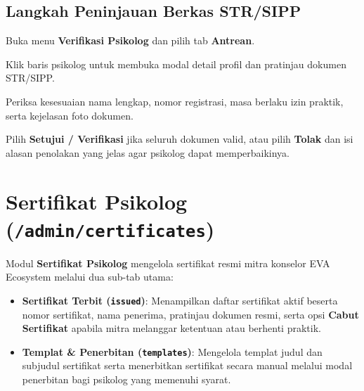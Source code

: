 \subsection{Langkah Peninjauan Berkas STR/SIPP}
\begin{steplist}
  \item Buka menu \textbf{Verifikasi Psikolog} dan pilih tab \textbf{Antrean}.
  \item Klik baris psikolog untuk membuka modal detail profil dan pratinjau dokumen STR/SIPP.
  \item Periksa kesesuaian nama lengkap, nomor registrasi, masa berlaku izin praktik, serta kejelasan foto dokumen.
  \item Pilih \textbf{Setujui / Verifikasi} jika seluruh dokumen valid, atau pilih \textbf{Tolak} dan isi alasan penolakan yang jelas agar psikolog dapat memperbaikinya.
\end{steplist}



\section{Sertifikat Psikolog (\texttt{/admin/certificates})}
Modul \textbf{Sertifikat Psikolog} mengelola sertifikat resmi mitra konselor EVA Ecosystem melalui dua sub-tab utama:
\begin{itemize}[leftmargin=1.4em]
  \item \textbf{Sertifikat Terbit (\texttt{issued})}: Menampilkan daftar sertifikat aktif beserta nomor sertifikat, nama penerima, pratinjau dokumen resmi, serta opsi \textbf{Cabut Sertifikat} apabila mitra melanggar ketentuan atau berhenti praktik.
  \item \textbf{Templat \& Penerbitan (\texttt{templates})}: Mengelola templat judul dan subjudul sertifikat serta menerbitkan sertifikat secara manual melalui modal penerbitan bagi psikolog yang memenuhi syarat.
\end{itemize}


